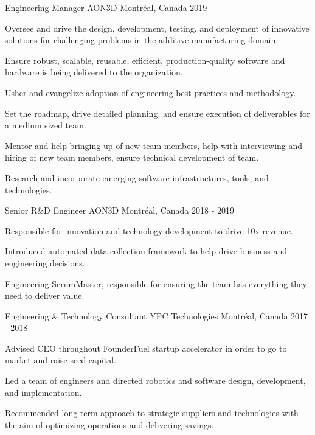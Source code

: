 \documentclass[11pt, letterpaper]{awesome-cv}
\begin{document}
\begin{cventries}

\cventry
{Engineering Manager}
{AON3D}
{Montréal, Canada}
{2019 - }
{
\begin{cvitems} 
\item{Oversee and drive the design, development, testing, and deployment of innovative solutions for challenging problems in the additive manufacturing domain.}
\item{Ensure robust, scalable, reusable, efficient, production-quality software and hardware is being delivered to the organization.}
\item{Usher and evangelize adoption of engineering best-practices and methodology.}
\item{Set the roadmap, drive detailed planning, and ensure execution of deliverables for a medium sized team.}
\item{Mentor and help bringing up of new team members, help with interviewing and hiring of new team members, ensure technical development of team.}
\item{Research and incorporate emerging software infrastructures, tools, and technologies.}
\end{cvitems}
}

\cventry
{Senior R\&D Engineer}
{AON3D}
{Montréal, Canada}
{2018 - 2019}
{
\begin{cvitems} 
\item{Responsible for innovation and technology development to drive 10x revenue.}
\item{Introduced automated data collection framework to help drive business and engineering decisions.}
\item{Engineering ScrumMaster, responsible for ensuring the team has everything they need to deliver value.}
\end{cvitems}
}

\cventry
{Engineering \& Technology Consultant}
{YPC Technologies}
{Montréal, Canada}
{2017 - 2018}
{
\begin{cvitems} 
\item{Advised CEO throughout FounderFuel startup accelerator in order to go to market and raise seed capital.}
\item{Led a team of engineers and directed robotics and software design, development, and implementation.}
\item{Recommended long-term approach to strategic suppliers and technologies with the aim of optimizing operations and delivering savings.}
\end{cvitems}
}


\end{cventries}
\end{document}
